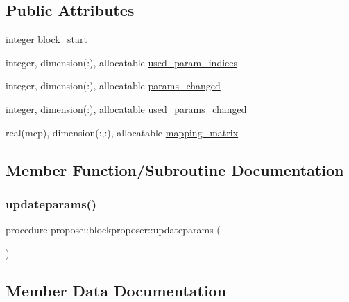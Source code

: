 \subsection*{Public Attributes}
\begin{DoxyCompactItemize}
\item 
integer \mbox{\hyperlink{structpropose_1_1blockproposer_aba76564d34a890da4c411fdaf5a39210}{block\+\_\+start}}
\item 
integer, dimension(\+:), allocatable \mbox{\hyperlink{structpropose_1_1blockproposer_aeabc5fea4e7e115c700d10649b71ed86}{used\+\_\+param\+\_\+indices}}
\item 
integer, dimension(\+:), allocatable \mbox{\hyperlink{structpropose_1_1blockproposer_adf2c8cb416a1f62ae93d6625578f2d85}{params\+\_\+changed}}
\item 
integer, dimension(\+:), allocatable \mbox{\hyperlink{structpropose_1_1blockproposer_ae78953989ed2fba841ae7b5caad4ebc9}{used\+\_\+params\+\_\+changed}}
\item 
real(mcp), dimension(\+:,\+:), allocatable \mbox{\hyperlink{structpropose_1_1blockproposer_a85db1365a166f96065c09c3645e97d30}{mapping\+\_\+matrix}}
\end{DoxyCompactItemize}


\subsection{Member Function/\+Subroutine Documentation}
\mbox{\label{structpropose_1_1blockproposer_ab36ed513060fc1aa09ce24269b46294a}} 
\subsubsection{\texorpdfstring{updateparams()}{updateparams()}}
{\footnotesize\ttfamily procedure propose\+::blockproposer\+::updateparams (\begin{DoxyParamCaption}{ }\end{DoxyParamCaption})}



\subsection{Member Data Documentation}
\mbox{\label{structpropose_1_1blockproposer_aba76564d34a890da4c411fdaf5a39210}} 
